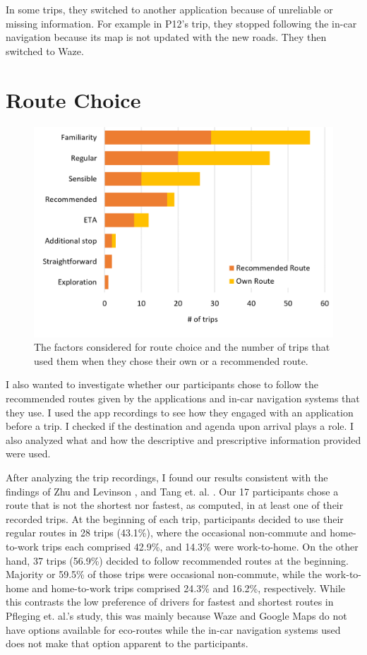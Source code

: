 In some trips, they switched to another application because of unreliable or missing information. For example in P12's trip, they stopped following the in-car navigation because its map is not updated with the new roads. They then switched to Waze.

\section{Route Choice}

\begin{figure}[t]
  \centering
  \includegraphics[scale=0.6]{figures/s1-route-choice-result.png}
  \caption{The factors considered for route choice and the number of trips that used them when they chose their own or a recommended route.}
  \label{fig:s1-reason_route_choice}
\end{figure}

I also wanted to investigate whether our participants chose to follow the recommended routes given by the applications and in-car navigation systems that they use. I used the app recordings to see how they engaged with an application before a trip. I checked if the destination and agenda upon arrival plays a role. I also analyzed what and how the descriptive and prescriptive information provided were used. 

After analyzing the trip recordings, I found our results consistent with the findings of Zhu and Levinson \cite{Zhu2015DoPrinciple}, and Tang et. al. \cite{Tang2016AnalyzingData}. Our 17 participants chose a route that is not the shortest nor fastest, as computed, in at least one of their recorded trips. At the beginning of each trip, participants decided to use their regular routes in 28 trips (43.1\%), where the occasional non-commute and home-to-work trips each comprised 42.9\%, and 14.3\% were work-to-home. On the other hand, 37 trips (56.9\%) decided to follow recommended routes at the beginning. Majority or 59.5\% of those trips were occasional non-commute, while the work-to-home and home-to-work trips comprised 24.3\% and 16.2\%, respectively. While this contrasts the low preference of drivers for fastest and shortest routes in Pfleging et. al.'s \cite{Pfleging2014ExperienceNavigation} study, this was mainly because Waze and Google Maps do not have options available for eco-routes while the in-car navigation systems used does not make that option apparent to the participants.


